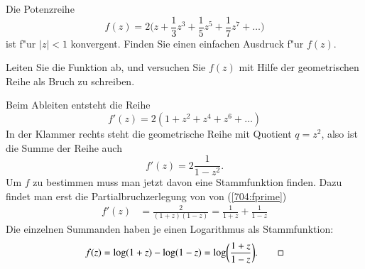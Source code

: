 Die Potenzreihe
\[
f(z)
=
2\biggl(z+\frac{1}{3}z^3+\frac{1}{5}z^5+\frac{1}{7}z^7+\dots\biggr)
\]
ist f"ur $|z|<1$ konvergent.
Finden Sie einen einfachen Ausdruck f"ur $f(z)$.

\begin{hinweis}
Leiten Sie die Funktion ab, und versuchen Sie $f(z)$ mit Hilfe der
geometrischen Reihe als Bruch zu schreiben.
\end{hinweis}

\begin{loesung}
Beim Ableiten entsteht die Reihe
\[
f'(z) = 2(1+z^2+z^4+z^6+\dots)
\]
In der Klammer rechts steht die geometrische Reihe mit Quotient $q=z^2$,
also ist die Summe der Reihe auch
\begin{equation}
f'(z)=2\frac{1}{1-z^2}.
\label{704:fprime}
\end{equation}
Um $f$ zu bestimmen muss man jetzt davon eine Stammfunktion finden.
Dazu findet man erst die Partialbruchzerlegung von von (\ref{704:fprime})
\begin{align*}
f'(z)
&=
\frac{2}{(1+z)(1-z)}
=
\frac1{1+z}+\frac1{1-z}
\end{align*}
Die einzelnen Summanden haben je einen Logarithmus als Stammfunktion:
\[
f(z) = \log(1+z)-\log(1-z)=\log\biggl(\frac{1+z}{1-z}\biggr).
\qedhere
\]
\end{loesung}

